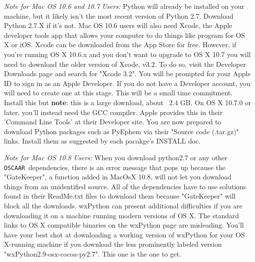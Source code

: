 \documentclass[a4paper]{article}
\newcommand{\code}[1]{\texttt{#1}}
\newcommand{\oscaar}{\code{OSCAAR}~}
\begin{document}
\textit{Note for Mac OS 10.6 and 10.7 Users:} Python will already be installed on your machine, but it likely isn't the most recent version of Python 2.7. Download Python 2.7.X if it's not. Mac OS 10.6 users will also need Xcode, the Apple developer tools app that allows your computer to do things like program for OS X or iOS. Xcode can be downloaded from the App Store for free. However, if you're running OS X 10.6.x and you don't want to upgrade to OS X 10.7 you will need to download the older version of Xcode, v3.2. To do so, visit the Developer Downloads page and search for "Xcode 3.2". You will be prompted for your Apple ID to sign in as an Apple Developer. If you do not have a Developer account, you will need to create one at this stage. This will be a small time commitment. Install this but \textbf{note}: this is a large download, about ~2.4 GB. On OS X 10.7.0 or later, you'll instead need the GCC compiler. Apple provides this in their 'Command Line Tools' at their Developer site. You are now prepared to download Python packages such as PyEphem via their "Source code (.tar.gz)" links. Install them as suggested by each pacakge's INSTALL doc.

\textit{Note for Mac OS 10.8 Users:} When you download python2.7 or any other \oscaar dependencies, there is an error message that pops up because the "GateKeeper", a function added in MacOsX 10.8, will not let you download things from an unidentified source. All of the dependencies have to use solutions found in their ReadMe.txt files to download them because "GateKeeper" will block all the downloads. wxPython can present additional difficulties if you are downloading it on a machine running modern versions of OS X. The standard links to OS X compatible binaries on the wxPython page are misleading. You'll have your best shot at downloading a working version of wxPython for your OS X-running machine if you download the less prominently labeled version "wxPython2.9-osx-cocoa-py2.7". This one is the one to get.
\end{document}
